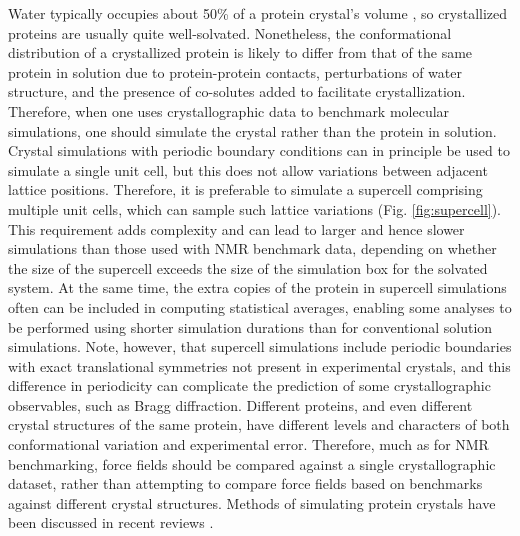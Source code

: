 \documentclass[9pt,review,pubversion]{livecoms}
\begin{document}
Water typically occupies about 50\% of a protein crystal’s volume \cite{altan_learning_2018}, so crystallized proteins are usually quite well-solvated.
Nonetheless, the conformational distribution of a crystallized protein is likely to differ from that of the same protein in solution due to protein-protein contacts, perturbations of water structure, and the presence of co-solutes added to facilitate crystallization.
Therefore, when one uses crystallographic data to benchmark molecular simulations, one should simulate the crystal rather than the protein in solution.
Crystal simulations with periodic boundary conditions can in principle be used to simulate a single unit cell, but this does not allow variations between adjacent lattice positions.
Therefore, it is preferable to simulate a supercell comprising multiple unit cells, which can sample such lattice variations (Fig. \ref{fig:supercell}).
This requirement adds complexity and can lead to larger and hence slower simulations than those used with NMR benchmark data, depending on whether the size of the supercell exceeds the size of the simulation box for the solvated system.
At the same time, the extra copies of the protein in supercell simulations often can be included in computing statistical averages, enabling some analyses to be performed using shorter simulation durations than for conventional solution simulations.
Note, however, that supercell simulations include periodic boundaries with exact translational symmetries not present in experimental crystals, and this difference in periodicity can complicate the prediction of some crystallographic observables, such as Bragg diffraction.
Different proteins, and even different crystal structures of the same protein, have different levels and characters of both conformational variation and experimental error.
Therefore, much as for NMR benchmarking, force fields should be compared against a single crystallographic dataset, rather than attempting to compare force fields based on benchmarks against different crystal structures.
Methods of simulating protein crystals have been discussed in recent reviews \cite{cerutti_molecular_2019,wych_molecular-dynamics_2023}.
\end{document}
